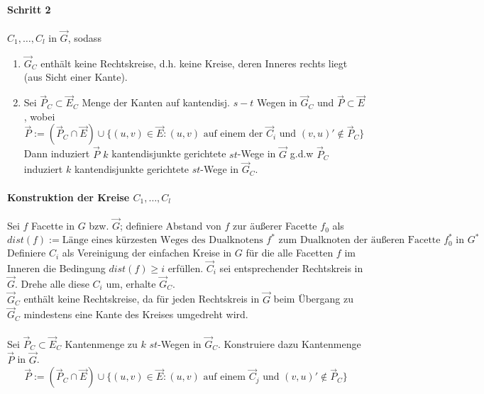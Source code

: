 \documentclass{article}
\begin{document}
\paragraph{Schritt 2}
$C_1,\ldots, C_l$ in $\overrightarrow{G}$, sodass
\begin{enumerate}
	\item $\overrightarrow{G}_C$ enthält keine Rechtskreise, d.h. keine Kreise, deren Inneres rechts liegt (aus Sicht einer Kante).
	\item Sei $\overrightarrow{P}_C \subset \overrightarrow{E}_C$ Menge der Kanten auf kantendisj. $s-t$ Wegen in $\overrightarrow{G}_C$ und $\overrightarrow{P} \subset \overrightarrow{E}$, wobei
	\[\overrightarrow{P} := (\overrightarrow{P}_C \cap \overrightarrow{E})\cup \{(u,v) \in \overrightarrow{E}: (u,v) \text{ auf einem der }\overrightarrow{C}_i \text{ und } (v,u)' \notin \overrightarrow{P}_C \} \]
	Dann induziert $\overrightarrow{P}$ $k$ kantendisjunkte gerichtete $st$-Wege in $\overrightarrow{G}$ g.d.w $\overrightarrow{P}_C$ induziert $k$ kantendisjunkte gerichtete $st$-Wege in $\overrightarrow{G}_C$.
\end{enumerate}

\paragraph{Konstruktion der Kreise $C_1, \ldots, C_l$}
Sei $f$ Facette in $G$ bzw. $\overrightarrow{G}$; definiere Abstand von $f$ zur äußerer Facette $f_0$ als
\[dist(f) := \text{Länge eines kürzesten Weges des Dualknotens }f^* \text{ zum Dualknoten der äußeren Facette }f_0^* \text{ in }G^*\]
Definiere $C_i$ als Vereinigung der einfachen Kreise in $G$ für die alle Facetten $f$ im Inneren die Bedingung $dist(f) \geq i$ erfüllen. $\overrightarrow{C}_i$ sei entsprechender Rechtskreis in $\overrightarrow{G}$.
Drehe alle diese $C_i$ um, erhalte $\overrightarrow{G}_C$.\\
$\overrightarrow{G}_C$ enthält keine Rechtskreise, da für jeden Rechtskreis in $\overrightarrow{G}$ beim Übergang zu $\overrightarrow{G}_C$ mindestens eine Kante des Kreises umgedreht wird.\\\\

Sei $\overrightarrow{P}_C \subset \overrightarrow{E}_C$ Kantenmenge zu $k$ $st$-Wegen in $\overrightarrow{G}_C$. Konstruiere dazu Kantenmenge $\overrightarrow{P}$ in $\overrightarrow{G}$.
\[\overrightarrow{P} := (\overrightarrow{P}_C \cap \overrightarrow{E})\cup
\{(u,v) \in \overrightarrow{E}: (u,v) \text{ auf einem }\overrightarrow{C}_j \text{ und }(v,u)' \notin \overrightarrow{P}_C \}
\]
\end{document}
